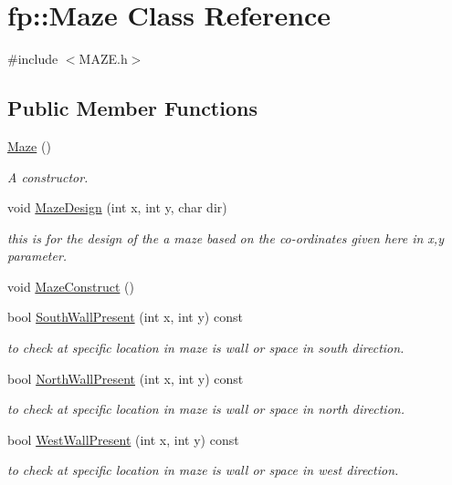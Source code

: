 \hypertarget{classfp_1_1_maze}{}\section{fp\+:\+:Maze Class Reference}
\label{classfp_1_1_maze}


{\ttfamily \#include $<$M\+A\+Z\+E.\+h$>$}

\subsection*{Public Member Functions}
\begin{DoxyCompactItemize}
\item 
\hyperlink{classfp_1_1_maze_af090b97595ed34cad9f7c8de9e79a127}{Maze} ()
\begin{DoxyCompactList}\small\item\em A constructor. \end{DoxyCompactList}\item 
void \hyperlink{classfp_1_1_maze_a9771da7e8af1d23454f9b5cb1986462b}{Maze\+Design} (int x, int y, char dir)
\begin{DoxyCompactList}\small\item\em this is for the design of the a maze based on the co-\/ordinates given here in x,y parameter. \end{DoxyCompactList}\item 
void \hyperlink{classfp_1_1_maze_a7aed0c5288e08efda078782f23bc8368}{Maze\+Construct} ()
\item 
bool \hyperlink{classfp_1_1_maze_a6cc110e308818595983345285245c33f}{South\+Wall\+Present} (int x, int y) const
\begin{DoxyCompactList}\small\item\em to check at specific location in maze is wall or space in south direction. \end{DoxyCompactList}\item 
bool \hyperlink{classfp_1_1_maze_af072147db014d3955ba343cd8250d5f1}{North\+Wall\+Present} (int x, int y) const
\begin{DoxyCompactList}\small\item\em to check at specific location in maze is wall or space in north direction. \end{DoxyCompactList}\item 
bool \hyperlink{classfp_1_1_maze_a62c5692927ef95bafad2f0b7ae95a83e}{West\+Wall\+Present} (int x, int y) const
\begin{DoxyCompactList}\small\item\em to check at specific location in maze is wall or space in west direction. \end{DoxyCompactList}\item 

\end{DoxyCompactItemize}
